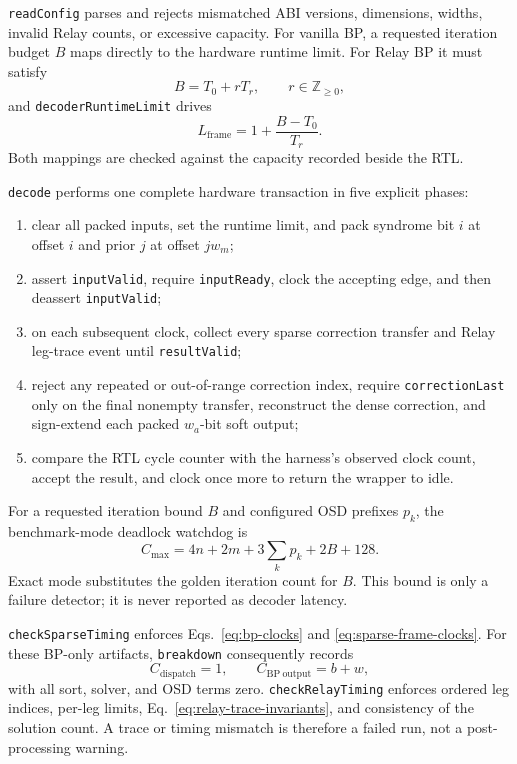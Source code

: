 \documentclass[10pt,conference]{IEEEtran}
\begin{document}
\texttt{readConfig} parses  and rejects mismatched
ABI versions, dimensions, widths, invalid Relay counts, or excessive capacity.
For vanilla BP, a requested iteration budget $B$ maps directly to the hardware
runtime limit.  For Relay BP it must satisfy
\begin{equation}
 B=T_0+rT_r,\qquad r\in\mathbb Z_{\geq0},
 \label{eq:relay-runtime-budget}
\end{equation}
and \texttt{decoderRuntimeLimit} drives
\begin{equation}
 L_{\mathrm{frame}}=1+\frac{B-T_0}{T_r}.
 \label{eq:budget-to-legs}
\end{equation}
Both mappings are checked against the capacity recorded beside the RTL.

\texttt{decode} performs one complete hardware transaction in five explicit
phases:
\begin{enumerate}
  \item clear all packed inputs, set the runtime limit, and pack syndrome bit
        $i$ at offset $i$ and prior $j$ at offset $jw_m$;
  \item assert \texttt{inputValid}, require \texttt{inputReady}, clock the
        accepting edge, and then deassert \texttt{inputValid};
  \item on each subsequent clock, collect every sparse correction transfer and
        Relay leg-trace event until \texttt{resultValid};
  \item reject any repeated or out-of-range correction index, require
        \texttt{correctionLast} only on the final nonempty transfer, reconstruct
        the dense correction, and sign-extend each packed $w_a$-bit soft output;
  \item compare the RTL cycle counter with the harness's observed clock count,
        accept the result, and clock once more to return the wrapper to idle.
\end{enumerate}
For a requested iteration bound $B$ and configured OSD prefixes $p_k$, the
benchmark-mode deadlock watchdog is
\begin{equation}
 C_{\max}=4n+2m+3\sum_k p_k+2B+128.
 \label{eq:sim-watchdog}
\end{equation}
Exact mode substitutes the golden iteration count for $B$.  This bound is only
a failure detector; it is never reported as decoder latency.

\texttt{checkSparseTiming} enforces Eqs.~\eqref{eq:bp-clocks} and
\eqref{eq:sparse-frame-clocks}.  For these BP-only artifacts,
\texttt{breakdown} consequently records
\begin{equation}
 C_{\mathrm{dispatch}}=1,\qquad
 C_{\mathrm{BP\ output}}=b+w,
 \label{eq:sim-breakdown}
\end{equation}
with all sort, solver, and OSD terms zero.  \texttt{checkRelayTiming} enforces ordered leg
indices, per-leg limits, Eq.~\eqref{eq:relay-trace-invariants}, and consistency
of the solution count.  A trace or timing mismatch is therefore a failed run,
not a post-processing warning.
\end{document}
